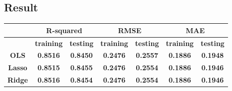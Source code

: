 \documentclass[11pt,a4paper]{article}
\begin{document}
\subsection{Result}
\begin{table}[H]
\centering
\begin{tabular}{|c|cc|cc|cc|}
\hline
\textbf{}                                     & \multicolumn{2}{c|}{\textbf{R-squared}}                                                                                      & \multicolumn{2}{c|}{\textbf{RMSE}}                                                                                           & \multicolumn{2}{c|}{\textbf{MAE}}                                                                                            \\ \hline
\textbf{}                                     & \multicolumn{1}{c|}{\textbf{training}}                                              & \textbf{testing}                       & \multicolumn{1}{c|}{\textbf{training}}                                              & \textbf{testing}                       & \multicolumn{1}{c|}{\textbf{training}}                                              & \textbf{testing}                       \\ \hline
\textbf{OLS}                                  & \multicolumn{1}{c|}{\textbf{0.8516}}                                                & \textbf{0.8450}                        & \multicolumn{1}{c|}{{\color[HTML]{24292F} \textbf{0.2476}}}                         & {\color[HTML]{24292F} \textbf{0.2557}} & \multicolumn{1}{c|}{{\color[HTML]{24292F} \textbf{0.1886}}}                         & {\color[HTML]{24292F} \textbf{0.1948}} \\ \hline
\textbf{Lasso}                                & \multicolumn{1}{c|}{\textbf{0.8515}}                                                & \textbf{0.8455}                        & \multicolumn{1}{c|}{\textbf{0.2476}}                                                & \textbf{0.2554}                        & \multicolumn{1}{c|}{\textbf{0.1886}}                                                & \textbf{0.1946}                        \\ \hline
\textbf{Ridge}                                & \multicolumn{1}{c|}{\textbf{0.8516}}                                                & \textbf{0.8454}                        & \multicolumn{1}{c|}{\textbf{0.2476}}                                                & \textbf{0.2554}                        & \multicolumn{1}{c|}{\textbf{0.1886}}                                                & \textbf{0.1946}                        \\ \hline

\end{tabular}
\end{table}
\end{document}
